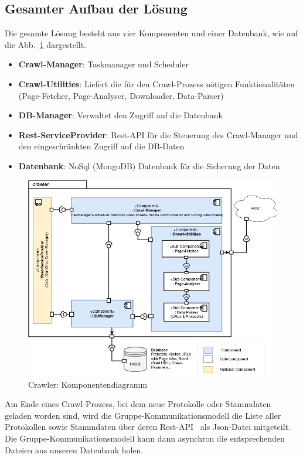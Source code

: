 \subsection{Gesamter Aufbau der Lösung}
Die gesamte Lösung besteht aus vier Komponenten und einer Datenbank, wie auf die Abb.~\ref{fig:crawlerKompoenenten} dargestellt. 
\begin{itemize}
    \item \textbf{Crawl-Manager}: Taskmanager und Scheduler
    \item \textbf{Crawl-Utilities}: Liefert die für den Crawl-Prozess nötigen Funktionalitäten (Page-Fetcher, Page-Analyser, Downloader, Data-Parser)
    \item \textbf{DB-Manager}: Verwaltet den Zugriff auf die Datenbank 
    \item \textbf{Rest-ServiceProvider}: Rest-API für die Steuerung des Crawl-Manager und den eingeschränkten Zugriff auf die DB-Daten
    \item \textbf{Datenbank}: NoSql (MongoDB) Datenbank für die Sicherung der Daten
\end{itemize}

\begin{figure}[H]
    \centering
    \includegraphics[width=5in]{images/02-Crawler/Crawler-Component-Diagram.png}
    \caption{Crawler: Komponentendiagramm}
    \label{fig:crawlerKompoenenten}
\end{figure}
\noindent
Am Ende eines Crawl-Prozess, bei dem neue Protokolle oder Stammdaten geladen worden sind, wird die Gruppe-Kommunikationsmodell die Liste aller Protokollen sowie Stammdaten über deren Rest-API~\cite{Cme2021} als Json-Datei mitgeteilt. Die Gruppe-Kommunikationsmodell kann dann asynchron die entsprechenden Dateien aus unseren Datenbank holen.